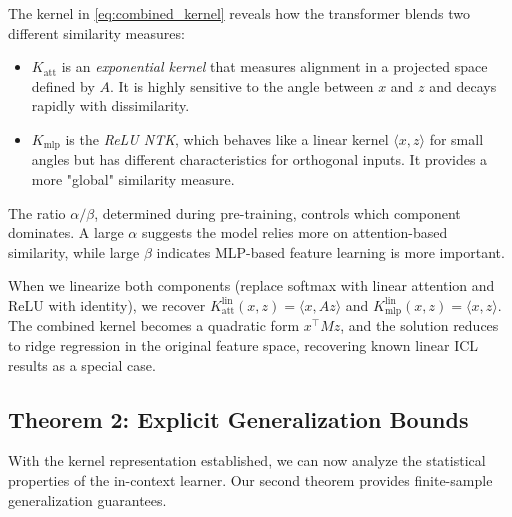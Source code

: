 	\begin{remark}
		The kernel in \eqref{eq:combined_kernel} reveals how the transformer blends two different similarity measures:
		\begin{itemize}
			\item \(K_{\text{att}}\) is an \textit{exponential kernel} that measures alignment in a projected space defined by \(A\). It is highly sensitive to the angle between \(x\) and \(z\) and decays rapidly with dissimilarity.
			\item \(K_{\text{mlp}}\) is the \textit{ReLU NTK}, which behaves like a linear kernel \(\langle x, z \rangle\) for small angles but has different characteristics for orthogonal inputs. It provides a more "global" similarity measure.
		\end{itemize}
		The ratio \(\alpha/\beta\), determined during pre-training, controls which component dominates. A large \(\alpha\) suggests the model relies more on attention-based similarity, while large \(\beta\) indicates MLP-based feature learning is more important.
	\end{remark}
	
	\begin{remark}
		When we linearize both components (replace softmax with linear attention and ReLU with identity), we recover \(K_{\text{att}}^{\text{lin}}(x, z) = \langle x, A z \rangle\) and \(K_{\text{mlp}}^{\text{lin}}(x, z) = \langle x, z \rangle\). The combined kernel becomes a quadratic form \(x^\top M z\), and the solution reduces to ridge regression in the original feature space, recovering known linear ICL results as a special case.
	\end{remark}
	
	\subsection{Theorem 2: Explicit Generalization Bounds}
	\label{subsec:thm2}
	
	With the kernel representation established, we can now analyze the statistical properties of the in-context learner. Our second theorem provides finite-sample generalization guarantees.
	
